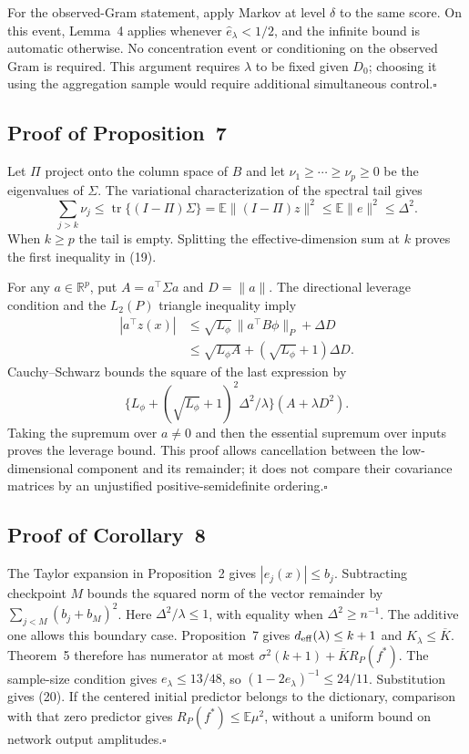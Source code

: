 \documentclass[pdflatex,sn-mathphys-ay]{sn-jnl}
\theoremstyle{remark}\newtheorem{remark}[theorem]{Remark}
\newcommand{\E}{\mathbb E}
\newcommand{\R}{\mathbb R}
\newcommand{\tr}{\operatorname{tr}}
\begin{document}
For the observed-Gram statement, apply Markov at level $\delta$ to the same score. On this event, Lemma~4 applies whenever $\widehat e_\lambda<1/2$, and the infinite bound is automatic otherwise. No concentration event or conditioning on the observed Gram is required. This argument requires $\lambda$ to be fixed given $D_0$; choosing it using the aggregation sample would require additional simultaneous control.\hfill$\square$

\subsection{Proof of Proposition~7}
Let $\Pi$ project onto the column space of $B$ and let $\nu_1\geq\cdots\geq\nu_p\geq0$ be the eigenvalues of $\Sigma$. The variational characterization of the spectral tail gives
\[
 \sum_{j>k}\nu_j\leq\tr\{(I-\Pi)\Sigma\}
 =\E\|(I-\Pi)z\|^2\leq\E\|e\|^2\leq\Delta^2.
\]
When $k\geq p$ the tail is empty. Splitting the effective-dimension sum at $k$ proves the first inequality in (19).

For any $a\in\R^p$, put $A=a^\top\Sigma a$ and $D=\|a\|$. The directional leverage condition and the $L_2(P)$ triangle inequality imply
\begin{align*}
 |a^\top z(x)|
 &\leq\sqrt{L_\phi}\,\|a^\top B\phi\|_P+\Delta D\\
 &\leq\sqrt{L_\phi A}+(\sqrt{L_\phi}+1)\Delta D.
\end{align*}
Cauchy--Schwarz bounds the square of the last expression by
\[
 \{L_\phi+(\sqrt{L_\phi}+1)^2\Delta^2/\lambda\}
 (A+\lambda D^2).
\]
Taking the supremum over $a\ne0$ and then the essential supremum over inputs proves the leverage bound. This proof allows cancellation between the low-dimensional component and its remainder; it does not compare their covariance matrices by an unjustified positive-semidefinite ordering.\hfill$\square$

\subsection{Proof of Corollary~8}
The Taylor expansion in Proposition~2 gives $|e_j(x)|\leq b_j$. Subtracting checkpoint $M$ bounds the squared norm of the vector remainder by $\sum_{j<M}(b_j+b_M)^2$. Here $\Delta^2/\lambda\leq1$, with equality when $\Delta^2\geq n^{-1}$. The additive one allows this boundary case. Proposition~7 gives $d_{\rm eff}(\lambda)\leq k+1$ and $K_\lambda\leq\overline K$. Theorem~5 therefore has numerator at most $\sigma^2(k+1)+\overline K R_P(f^*)$. The sample-size condition gives $e_\lambda\leq13/48$, so $(1-2e_\lambda)^{-1}\leq24/11$. Substitution gives (20). If the centered initial predictor belongs to the dictionary, comparison with that zero predictor gives $R_P(f^*)\leq\E\mu^2$, without a uniform bound on network output amplitudes.\hfill$\square$
\end{document}
